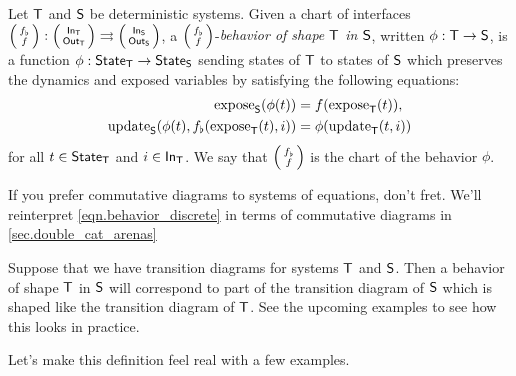 \documentclass[DynamicalBook]{subfiles}
\begin{document}
\begin{definition} \label{def.behavior_discrete}
  Let $\mathsf{T}$ and $\mathsf{S}$ be deterministic systems. Given a chart of interfaces $\lens{f_{\flat}}{f}:
  \lens{\In{T}}{\Out{T}} \rightrightarrows \lens{\In{S}}{\Out{S}}$, a $\lens{f_{\flat}}{f}$-\emph{behavior of
  shape $\mathsf{T}$ in $\mathsf{S}$}, written
 $\phi :
\mathsf{T} \to \mathsf{S}$, is a function $\phi : \mathsf{State}_{\mathsf{T}} \to \mathsf{State}_{\mathsf{S}}$ sending
states of $\mathsf{T}$ to states of $\mathsf{S}$ which preserves the dynamics and
exposed variables by satisfying the following equations:
\begin{equation}\label{eqn.behavior_discrete}
\begin{aligned}
  \mathrm{expose}_{\mathsf{S}}(\phi(t)) &= f(\mathrm{expose}_{\mathsf{T}}(t)), \\
  \mathrm{update}_{\mathsf{S}}(\phi(t), f_{\flat}(\mathrm{expose}_{\mathsf{T}}(t), i)) &= \phi(\mathrm{update}_{\mathsf{T}}(t, i))
\end{aligned}
\end{equation}
for all $t \in \mathsf{State}_{\mathsf{T}}$ and $i \in \mathsf{In}_{\mathsf{T}}$. We say that $\lens{f_{\flat}}{f}$
is the chart of the behavior $\phi$.
\end{definition}

\begin{remark}
  If you prefer commutative diagrams to systems of equations, don't fret. We'll
  reinterpret \cref{eqn.behavior_discrete} in terms of commutative diagrams in \cref{sec.double_cat_arenas}
\end{remark}

\begin{remark}
  Suppose that we have transition diagrams for systems $\mathsf{T}$ and $\mathsf{S}$.
  Then a behavior of shape $\mathsf{T}$ in $\mathsf{S}$ will correspond to part of the
  transition diagram of $\mathsf{S}$ which is shaped like the transition diagram of
  $\mathsf{T}$. See the upcoming examples to see how this looks in practice.
\end{remark}

 Let's make this definition feel real with a few examples.
\end{document}
